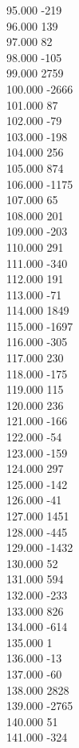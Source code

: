 { 95.000	-219 \\
 96.000	139 \\
 97.000	82 \\
 98.000	-105 \\
 99.000	2759 \\
 100.000	-2666 \\
 101.000	87 \\
 102.000	-79 \\
 103.000	-198 \\
 104.000	256 \\
 105.000	874 \\
 106.000	-1175 \\
 107.000	65 \\
 108.000	201 \\
 109.000	-203 \\
 110.000	291 \\
 111.000	-340 \\
 112.000	191 \\
 113.000	-71 \\
 114.000	1849 \\
 115.000	-1697 \\
 116.000	-305 \\
 117.000	230 \\
 118.000	-175 \\
 119.000	115 \\
 120.000	236 \\
 121.000	-166 \\
 122.000	-54 \\
 123.000	-159 \\
 124.000	297 \\
 125.000	-142 \\
 126.000	-41 \\
 127.000	1451 \\
 128.000	-445 \\
 129.000	-1432 \\
 130.000	52 \\
 131.000	594 \\
 132.000	-233 \\
 133.000	826 \\
 134.000	-614 \\
 135.000	1 \\
 136.000	-13 \\
 137.000	-60 \\
 138.000	2828 \\
 139.000	-2765 \\
 140.000	51 \\
 141.000	-324 \\
}
